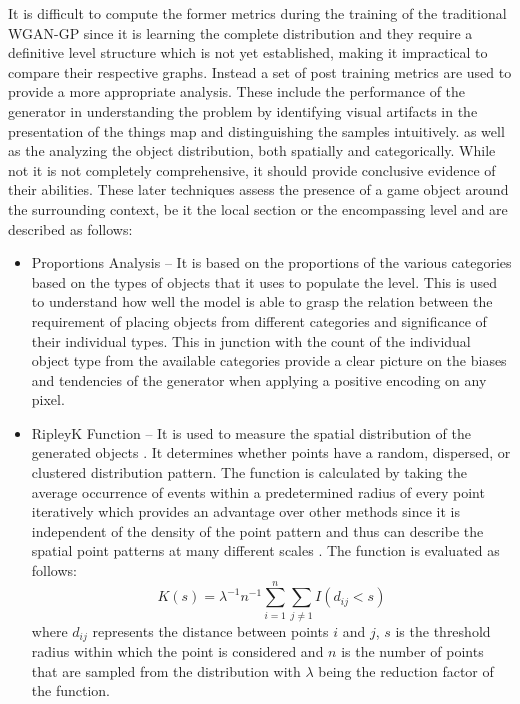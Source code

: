 \documentclass{Configuration_Files/PoliMi3i_thesis}
\begin{document}
It is difficult to compute the former metrics during the training of the traditional WGAN-GP 
since it is learning the complete distribution and they require a definitive level structure 
which is not yet established, making it impractical to compare their respective graphs. 
Instead a set of post training metrics are used to provide a more appropriate analysis. 
These include the performance of the generator in understanding the problem by 
identifying visual artifacts in the presentation of the things map and distinguishing 
the samples intuitively. as well as the analyzing the object distribution, both spatially 
and categorically. While not it is not completely comprehensive,  it should provide conclusive 
evidence of their abilities. These later techniques assess the presence of a game object around 
the surrounding context, be it the local section or the encompassing level and are 
described as follows:
\begin{itemize}
\item Proportions Analysis – It is based on the proportions of the various categories 
based on the types of objects that it uses to populate the level. This is used to 
understand how well the model is able to grasp the relation between the 
requirement of placing objects from different categories and significance of 
their individual types. This in junction with the count of the individual object 
type from the available categories provide a clear picture on the biases and 
tendencies of the generator when applying a positive encoding on any pixel.
\item RipleyK Function – It is used to measure the spatial distribution of the generated 
objects \cite{BdR17}. It determines whether points have a random, dispersed, or 
clustered distribution pattern. The function is calculated by taking the average
 occurrence of events within a predetermined radius of every point iteratively 
which provides an advantage over other methods since it is independent of the density
 of the point pattern and thus can describe the spatial point patterns at many different 
scales \cite{LiW15}. The function is evaluated as follows:
\begin{equation} \label{eq:ripleyk}
K(s) = \lambda^{-1} n^{-1} \sum_{i=1}^n \sum_{j\neq 1} I(d_{ij}<s)
\end{equation}
where $d_{ij}$ represents the distance between points $i$ and $j$, $s$ is the threshold 
radius within which the point is considered and $n$ is the number of points 
that are sampled from the distribution with $\lambda$ being the reduction factor 
of the function. 
\end{itemize}
\newpage
\end{document}
